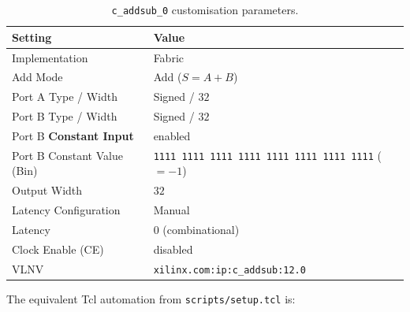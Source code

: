 \documentclass[11pt,letterpaper]{article}
\begin{document}
\begin{table}[H]
    \centering
    \caption{\texttt{c\_addsub\_0} customisation parameters.}
    \label{tab:ipconfig}
    \begin{tabular}{ll}
        \toprule
        \textbf{Setting} & \textbf{Value} \\
        \midrule
        Implementation                & Fabric                                   \\
        Add Mode                      & Add ($S = A + B$)                        \\
        Port A Type / Width           & Signed / $32$                             \\
        Port B Type / Width           & Signed / $32$                             \\
        Port B \textbf{Constant Input}& enabled                                  \\
        Port B Constant Value (Bin)   & \texttt{1111\,1111\,1111\,1111\,1111\,1111\,1111\,1111} ($= -1$) \\
        Output Width                  & $32$                                     \\
        Latency Configuration         & Manual                                   \\
        Latency                       & $0$ (combinational)                      \\
        Clock Enable (CE)             & disabled                                 \\
        VLNV                          & \texttt{xilinx.com:ip:c\_addsub:12.0}    \\
        \bottomrule
    \end{tabular}
\end{table}

The equivalent Tcl automation from \texttt{scripts/setup.tcl} is:
\end{document}
